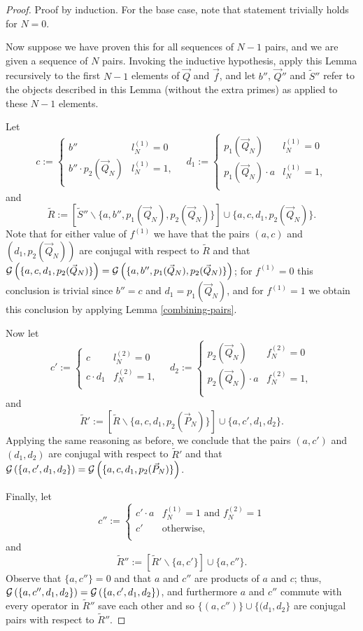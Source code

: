 \documentclass[twocolumn,showpacs,preprintnumbers,amsmath,amssymb,nofootinbib,pra,floatfix]{revtex4-1}
\newcommand{\lst}{\vec}
\newcommand{\set}{\tilde}
\newcommand{\genfun}{\mathcal{G}}
\begin{document}
\begin{proof}
Proof by induction.  For the base case, note that statement trivially holds for $N=0$.

Now suppose we have proven this for all sequences of $N-1$ pairs, and we are given a sequence of $N$ pairs.  Invoking the inductive hypothesis, apply this Lemma recursively to the first $N-1$ elements of $\lst Q$ and $\lst f$, and let $b''$, $\lst Q''$ and $\set S''$ refer to the objects described in this Lemma (without the extra primes) as applied to these $N-1$ elements.

Let
$$
c := 
\begin{cases}
b'' & l^{(1)}_N = 0\\
b'' \cdot p_2(\lst Q_N)  &  l^{(1)}_N = 1,\\
\end{cases}
\quad
d_1 :=
\begin{cases}
p_1(\lst Q_N) & l^{(1)}_N = 0\\
p_1(\lst Q_N) \cdot a &  l^{(1)}_N = 1,\\
\end{cases}
$$
and
$$\set R := \left[\set S''\backslash\{a,b'',p_1(\lst Q_N),p_2(\lst Q_N)\}\right]\cup \{a,c,d_1,p_2(\lst Q_N)\}.$$
Note that for either value of $f^{(1)}$ we have that the pairs $(a,c)$ and $(d_1,p_2(\lst Q_N))$ are conjugal with respect to $\set R$ and that $\genfun\paren{\{a,c,d_1,p_2(\lst Q_N)\}}=\genfun\paren{\{a,b'',p_1(\lst Q_N),p_2(\lst Q_N)\}}$; for $f^{(1)}=0$ this conclusion is trivial since $b''=c$ and $d_1=p_1(\lst Q_N)$, and for $f^{(1)}=1$ we obtain this conclusion by applying Lemma \ref{combining-pairs}.

Now let
$$
c' := 
\begin{cases}
c & l^{(2)}_N = 0\\
c \cdot d_1  &  f^{(2)}_N = 1,\\
\end{cases}
\quad
d_2 :=
\begin{cases}
p_2(\lst Q_N) & f^{(2)}_N = 0\\
p_2(\lst Q_N) \cdot a &  f^{(2)}_N = 1,\\
\end{cases}
$$
and
$$\set R' := \left[\set R\backslash\{a,c,d_1,p_2(\lst P_N)\}\right]\cup \{a,c',d_1,d_2\}.$$
Applying the same reasoning as before, we conclude that the pairs $(a,c')$ and $(d_1,d_2)$ are conjugal with respect to $\set R'$ and that $\genfun\paren{\{a,c',d_1,d_2\}}=\genfun\paren{\{a,c,d_1,p_2(\lst P_N)\}}$.

Finally, let
$$c'' :=
\begin{cases}
c' \cdot a & f^{(1)}_N = 1 \,\,\text{and}\,\, f^{(2)}_N = 1 \\
c' & \text{otherwise},\\
\end{cases}
$$
and
$$
\set R'':=
\left[\set R'\backslash\{a,c'\}\right]\cup \{a,c''\}.
$$
Observe that $\{a,c''\}=0$ and that $a$ and $c''$ are products of $a$ and $c$;  thus, $\genfun\paren{\{a,c'',d_1,d_2\}}=\genfun\paren{\{a,c',d_1,d_2\}}$, and furthermore $a$ and $c''$ commute with every operator in $\set R''$ save each other and so $\{(a,c'')\} \cup \{(d_1,d_2\}$ are conjugal pairs with respect to $\set R''$.


\end{proof}
\end{document}
